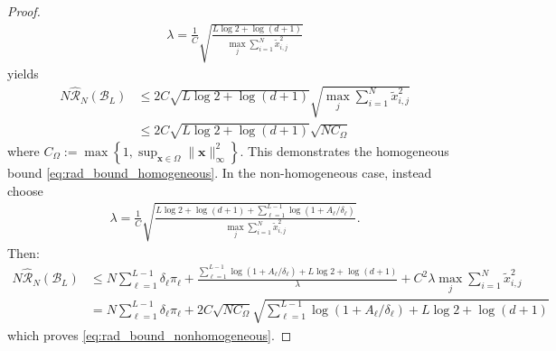 \documentclass{article}
\def\vx{{\bm{x}}}
\def\cB{{\mathcal{B}}}
\def\cR{{\mathcal{R}}}
\begin{document}
\begin{appendices}
\begin{proof}
\begin{align}
        \lambda = \frac{1}{C} \sqrt{\frac{L \log 2 + \log(d+1)}{\max_j \sum_{i=1}^N \widetilde{x}_{i,j}^2}}
    \end{align}
    yields
    \begin{align}
        N \widehat{\cR}_N(\cB_L) &\leq 2 C  \sqrt{L \log 2 + \log(d+1)} \sqrt{\max_j \sum_{i=1}^N \widetilde{x}_{i,j}^2} \\
        &\leq 2 C \sqrt{L \log 2 + \log(d+1)} \sqrt{N C_\Omega} 
    \end{align}
    where $C_\Omega := \max \left\{ 1, \sup_{\vx \in \Omega} \| \vx \|_\infty^2 \right\}$. This demonstrates the homogeneous bound \eqref{eq:rad_bound_homogeneous}. In the non-homogeneous case, instead choose
    \begin{align}
        \lambda = \frac{1}{C} \sqrt{\frac{L \log 2 + \log(d+1) + \sum_{\ell=1}^{L-1} \log (1+A_\ell/\delta_\ell)}{\max_j \sum_{i=1}^N \widetilde{x}_{i,j}^2}}.
    \end{align}
    Then:
    \begin{align}
        N \widehat{\cR}_N(\cB_L) &\leq N \sum_{\ell=1}^{L-1} \delta_\ell \pi_\ell  +   \frac{ \sum_{\ell=1}^{L-1} \log (1+A_\ell/\delta_\ell) +  L \log 2 + \log(d + 1) }{\lambda} + C^2 \lambda \max_j \sum_{i=1}^N \widetilde{x}_{i,j}^2 \\ &= N \sum_{\ell=1}^{L-1} \delta_\ell \pi_\ell  +   2 C  \sqrt{N C_\Omega}  \sqrt{\sum_{\ell=1}^{L-1} \log(1+A_\ell/\delta_\ell) +  L \log 2 + \log(d+1)}
    \end{align}
    which proves \eqref{eq:rad_bound_nonhomogeneous}.
\end{proof}


\end{appendices}
\end{document}
